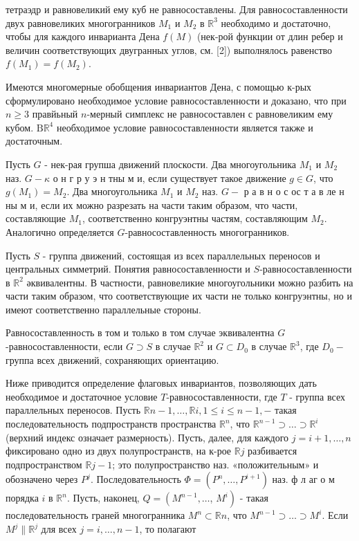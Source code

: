 \documentclass[10pt]{article}
\begin{document}
тетраэдр и равновеликий ему куб не равносоставлены. Для равносоставленности двух равновеликих многогранников $M_{1}$ и $M_{2}$ в $\mathbb{R}^{3}$ необходимо и достаточно, чтобы для каждого инварианта Дена $f(M)$ (нек-рой функции от длин ребер и величин соответствующих двугранных углов, см. [2]) выполнялось равенство $f\left(M_{1}\right)=f\left(M_{2}\right)$.



Имеются многомерные обобщения инвариантов Дена, с помощью к-рых сформулировано необходимое условие равносоставленности и доказано, что при $n \geqslant 3$ правйьный $n$-мерный симплекс не равносоставлен с равновеликим ему кубом. $\mathrm{B} \mathbb{R}^{4}$ необходимое условие равносоставленности является также и достаточным.



Пусть $G$ - нек-рая групша движений плоскости. Два многоугольника $M_{1}$ и $M_{2}$ наз. $G-\kappa$ о н г р у э н тны м и, если существует такое движение $g \in G$, что $g\left(M_{1}\right)=M_{2}$. Два многоугольника $M_{1}$ и $M_{2}$ наз. $G-$ р а в н о с ос т а в ле н ны м и, если их можно разрезать на части таким образом, что части, составляющие $M_{1}$, соответственно конгруэнтны частям, составляющим $M_{2}$. Аналогично определяется $G$-равносоставленность многогранников.



Пусть $S$ - группа движений, состоящая из всех параллельных переносов и центральных симметрий. Понятия равносоставленности и $S$-равносоставленности в $\mathbb{R}^{2}$ әквивалентны. В частности, равновеликие многоугольники можно разбить на части таким образом, что соответствующие их части не только конгруэнтны, но и имеют соответственно параллельные стороны.



Равносоставленность в том и только в том случае эквивалентна $G$-равносоставленности, если $G \supset S$ в случае $\mathbb{R}^{2}$ и $G \subset D_{0}$ в случае $\mathbb{R}^{3}$, где $D_{0}-$ группа всех движений, сохраняющих ориентацию.



Ниже приводится определение флаговых инвариантов, позволяющих дать необходимое и достаточное условие $T$-равносоставленности, где $T$ - группа всех параллельных переносов. Пусть $\mathbb{R} n-1, \ldots, \mathbb{R} i, 1 \leqslant i \leqslant n-1,-$ такая последовательность подпространств пространства $\mathbb{R}^{n}$, что $\mathbb{R}^{n-1} \supset \ldots \supset \mathbb{R}^{i}$ (верхний индекс означает размерность). Пусть, далее, для каждого $j=i+1, \ldots, n$ фиксировано одно из двух полупространств, на к-рое $\mathbb{R} j$ разбивается подпространством $\mathbb{R} j-1$; это полупространство наз. «положительным» и обозначено через $P^{j}$. Последовательность $\Phi=\left(P^{n}, \ldots, P^{i+1}\right)$ наз. ф л аг о м порядка $i$ в $\mathbb{R}^{n}$. Пусть, наконец, $Q=\left(M^{n-1}, \ldots\right.$, $\left.M^{i}\right)$ - такая последовательность граней многогранника $M^{n} \subset \mathbb{R} n$, что $M^{n-1} \supset \ldots \supset M^{i}$. Если $M^{j} \| \mathbb{R}^{j}$ для всех $j=i, \ldots, n-1$, то полагают
\end{document}
